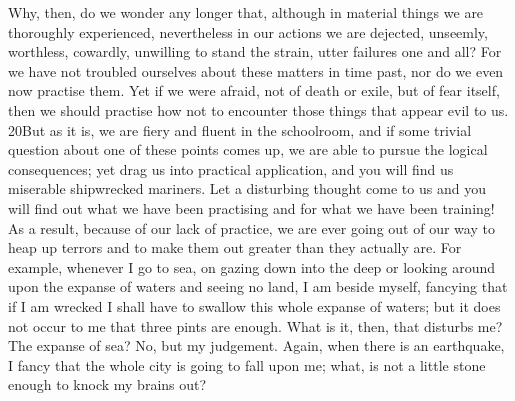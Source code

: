 Why, then, do we wonder any longer that, although in material things we are thoroughly experienced, nevertheless in our actions we are dejected, unseemly, worthless, cowardly, unwilling to stand the strain, utter failures one and all? For we have not troubled ourselves about these matters in time past, nor do we even now practise them. Yet if we were afraid, not of death or exile, but of fear itself, then we should practise how not to encounter those things that appear evil to us. 20But as it is, we are fiery and fluent in the schoolroom, and if some trivial question about one of these points comes up, we are able to pursue the logical consequences; yet drag us into practical application, and you will find us miserable shipwrecked mariners. Let a disturbing thought come to us and you will find out what we have been practising and for what we have been training! As a result, because of our lack of practice, we are ever going out of our way to heap up terrors and to make them out greater than they actually are. For example, whenever I go to sea, on gazing down into the deep or looking around upon the expanse of waters and seeing no land, I am beside myself, fancying that if I am wrecked I shall have to swallow this whole expanse of waters; but it does not occur to me that three pints are enough. What is it, then, that disturbs me? The expanse of sea? No, but my judgement. Again, when there is an earthquake, I fancy that the whole city is going to fall upon me; what, is not a little stone enough to knock my brains out?

